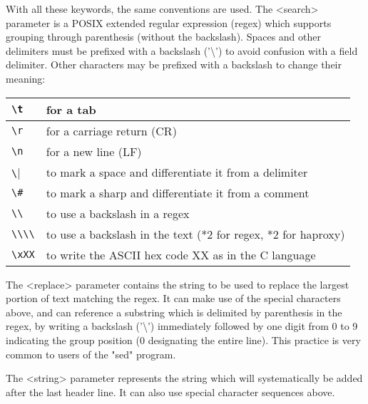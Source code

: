 With all these keywords, the same conventions are used. The <search> parameter
is a POSIX extended regular expression (regex) which supports grouping through
parenthesis (without the backslash). Spaces and other delimiters must be
prefixed with a backslash ('\textbackslash') to avoid confusion with a field delimiter.
Other characters may be prefixed with a backslash to change their meaning:

\vspace{3mm}
\begin{tabular}{|l|l|}
\hline
\verb|\t|   & for a tab \\
\hline
\verb|\r|   & for a carriage return (CR) \\
\hline
\verb|\n|   & for a new line (LF) \\
\hline
\verb|\|    & to mark a space and differentiate it from a delimiter \\
\hline
\verb|\#|   & to mark a sharp and differentiate it from a comment \\
\hline
\verb|\\|   & to use a backslash in a regex \\
\hline
\verb|\\\\| & to use a backslash in the text (*2 for regex, *2 for haproxy) \\
\hline
\verb|\xXX| & to write the ASCII hex code XX as in the C language \\
\hline
\end{tabular}
\vspace{3mm}

The <replace> parameter contains the string to be used to replace the largest
portion of text matching the regex. It can make use of the special characters
above, and can reference a substring which is delimited by parenthesis in the
regex, by writing a backslash ('\textbackslash') immediately followed by one digit from 0 to
9 indicating the group position (0 designating the entire line). This practice
is very common to users of the "sed" program.

The <string> parameter represents the string which will systematically be added
after the last header line. It can also use special character sequences above.

